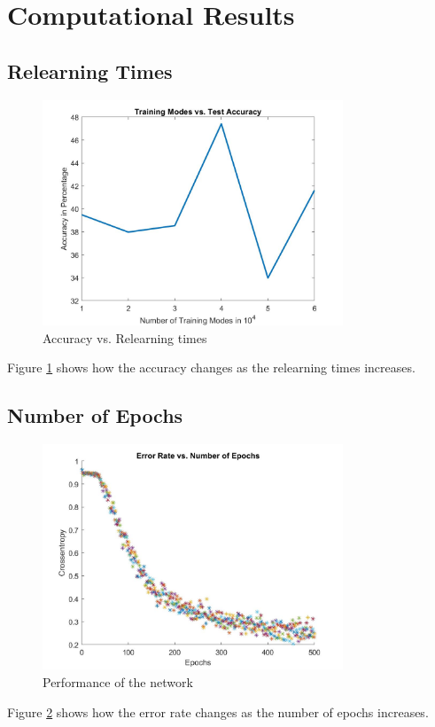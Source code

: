 \documentclass[preprint,12pt]{elsarticle}
\begin{document}
        \section{Computational Results}
        \subsection{Relearning Times}
        \begin{figure}[h]
            \center
            \includegraphics[width = 0.8\textwidth]{learn.jpg}
            \caption{Accuracy vs. Relearning times}
            \label{fig:4}
        \end{figure}
        Figure \ref{fig:4} shows how the accuracy changes as the relearning times increases.
        
        \subsection{Number of Epochs}
        \begin{figure}[h]
            \center
            \includegraphics[width = 0.8\textwidth]{err.jpg}
            \caption{Performance of the network}
            \label{fig:5}
        \end{figure}
        Figure \ref{fig:5} shows how the error rate changes as the number of epochs increases.
\end{document}
